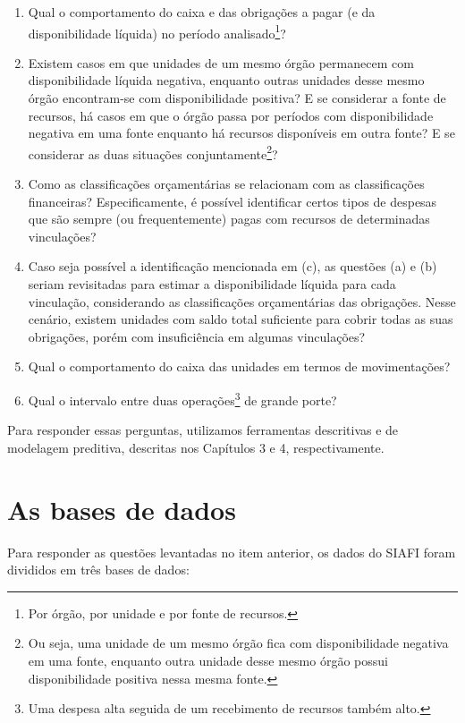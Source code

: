 \documentclass[]{book}
\let\rmarkdownfootnote\footnote%
\def\footnote{\protect\rmarkdownfootnote}
\begin{document}
\begin{enumerate}
\def\labelenumi{\alph{enumi}.}
\item
  Qual o comportamento do caixa e das obrigações a pagar (e da disponibilidade líquida) no período analisado\footnote{Por órgão, por unidade e por fonte de recursos.}?
\item
  Existem casos em que unidades de um mesmo órgão permanecem com disponibilidade líquida negativa, enquanto outras unidades desse mesmo órgão encontram-se com disponibilidade positiva? E se considerar a fonte de recursos, há casos em que o órgão passa por períodos com disponibilidade negativa em uma fonte enquanto há recursos disponíveis em outra fonte? E se considerar as duas situações conjuntamente\footnote{Ou seja, uma unidade de um mesmo órgão fica com disponibilidade negativa em uma fonte, enquanto outra unidade desse mesmo órgão possui disponibilidade positiva nessa mesma fonte.}?
\item
  Como as classificações orçamentárias se relacionam com as classificações financeiras? Especificamente, é possível identificar certos tipos de despesas que são sempre (ou frequentemente) pagas com recursos de determinadas vinculações?
\item
  Caso seja possível a identificação mencionada em (c), as questões (a) e (b) seriam revisitadas para estimar a disponibilidade líquida para cada vinculação, considerando as classificações orçamentárias das obrigações. Nesse cenário, existem unidades com saldo total suficiente para cobrir todas as suas obrigações, porém com insuficiência em algumas vinculações?
\item
  Qual o comportamento do caixa das unidades em termos de movimentações?
\item
  Qual o intervalo entre duas operações\footnote{Uma despesa alta seguida de um recebimento de recursos também alto.} de grande porte?
\end{enumerate}

Para responder essas perguntas, utilizamos ferramentas descritivas e de modelagem preditiva, descritas nos Capítulos 3 e 4, respectivamente.

\hypertarget{as-bases-de-dados}{%
\section{As bases de dados}\label{as-bases-de-dados}}

Para responder as questões levantadas no item anterior, os dados do SIAFI foram divididos em três bases de dados:
\end{document}
